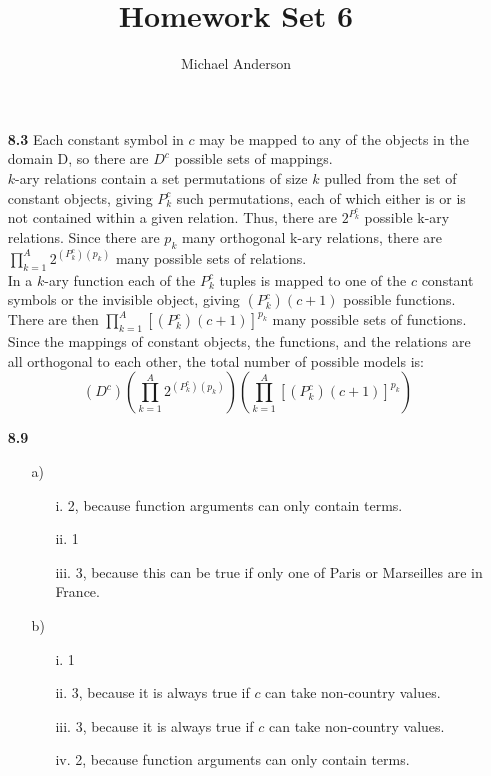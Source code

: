 \documentclass{article}
\author{Michael Anderson}
\title{Homework Set 6}
\begin{document}
\maketitle
\newpage
\begin{enumerate}
\item[\textbf{8.3}]
Each constant symbol in $c$ may be mapped to any of the objects in the domain
D, so there are $D^c$ possible sets of mappings.\\

$k$-ary relations contain a set
permutations of size $k$ pulled from the set of constant objects, giving
$P^c_k$ such permutations, each of which either is or is not contained within
a given relation. Thus, there are $2^{P^c_k}$ possible k-ary relations. Since
there are $p_k$ many orthogonal k-ary relations, there are 
$\prod^A_{k=1} 2^{(P^c_k)(p_k)}$ many possible sets of relations.\\

In a $k$-ary function each of the $P^c_k$ tuples is mapped to one of the $c$
constant symbols or the invisible object, giving $(P^c_k)(c+1)$ possible
functions. There are then $\prod^A_{k=1} [(P^c_k)(c+1)]^{p_k}$ many possible
sets of functions.\\

Since the mappings of constant objects, the functions, and the relations are
all orthogonal to each other, the total number of possible models is:
\[
(D^c)(\prod^A_{k=1} 2^{(P^c_k)(p_k)})(\prod^A_{k=1} [(P^c_k)(c+1)]^{p_k})
\]

\item[\textbf{8.9}]
\begin{enumerate}
\item[a)]
\begin{enumerate}
\item[i.] 2, because function arguments can only contain terms.
\item[ii.] 1
\item[iii.] 3, because this can be true if only one of Paris or Marseilles are in France.
\end{enumerate}

\item[b)]
\begin{enumerate}
\item[i.] 1
\item[ii.] 3, because it is always true if $c$ can take non-country values.
\item[iii.] 3, because it is always true if $c$ can take non-country values.
\item[iv.] 2, because function arguments can only contain terms.
\end{enumerate}


\end{enumerate}
\end{enumerate}
\end{document}
